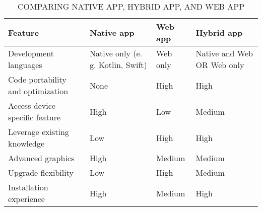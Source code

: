 \documentclass[conference]{IEEEtran}
\begin{document}
\begin{table}[htbp]
\caption{COMPARING NATIVE APP, HYBRID APP, AND WEB APP}
\begin{center}
\begin{tabular}{|p{2cm}|p{1.5cm}|p{1.5cm}|p{1.5cm}|}
\hline
\textbf{Feature} & \textbf{Native app} & \textbf{Web app} & \textbf{Hybrid app} \\
\hline
Development languages & Native only (e. g. Kotlin, Swift) & Web only & Native and Web OR Web only\\
\hline
Code portability and optimization & None & High & High \\
\hline
Access device-specific feature & High & Low & Medium \\
\hline
Leverage existing knowledge & Low & High & High \\
\hline
Advanced graphics & High & Medium & Medium \\
\hline
Upgrade flexibility & Low & High & Medium \\
\hline
Installation experience & High & Medium & High \\
\hline
\end{tabular}
\end{center}
\end{table}
\end{document}
